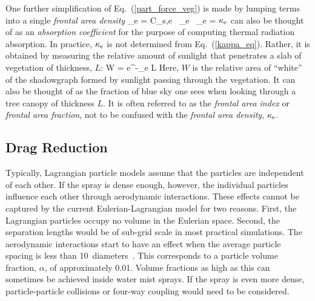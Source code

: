 One further simplification of Eq.~(\ref{part_force_veg}) is made by lumping terms into a single {\em frontal area density}
\be
   \kappa_{\rm e} = C_{\rm s,e} \,  \beta_{\rm e} \, \sigma_{\rm e} =  \label{kappa_eq}
\ee
$\kappa_{\rm e}$ can also be thought of as an {\em absorption coefficient} for the purpose of computing thermal radiation absorption. In practice, $\kappa_{\rm e}$ is not determined from Eq.~(\ref{kappa_eq}). Rather, it is obtained by measuring the relative amount of sunlight that penetrates a slab of vegetation of thickness, $L$:
\be
   W = {\rm e}^{-\kappa_{\rm e} L}
\ee
Here, $W$ is the relative area of ``white'' of the shadowgraph formed by sunlight passing through the vegetation. It can also be thought of as the fraction of blue sky one sees when looking through a tree canopy of thickness $L$. It is often referred to as the {\em frontal area index} or {\em frontal area fraction}, not to be confused with the {\em frontal area density}, $\kappa_{\rm e}$.

\subsection{Drag Reduction}
\label{sec:threeway}

Typically, Lagrangian particle models assume that the particles are independent of each other. If the spray is dense enough, however, the individual particles influence each other through aerodynamic interactions. These effects cannot be captured by the current Eulerian-Lagrangian model for two reasons. First, the Lagrangian particles occupy no volume in the Eulerian space. Second, the separation lengths would be of sub-grid scale in most practical simulations. The aerodynamic interactions start to have an effect when the average particle spacing is less than 10~diameters~\cite{Prahl:1,Prahl:2}. This corresponds to a particle volume fraction, $\alpha$, of approximately 0.01. Volume fractions as high as this can sometimes be achieved inside water mist sprays. If the spray is even more dense, particle-particle collisions or four-way coupling would need to be considered.

